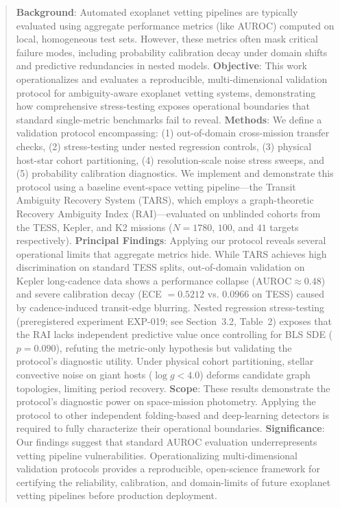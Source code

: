 \begin{abstract}
\textbf{Background}: Automated exoplanet vetting pipelines are typically evaluated using aggregate performance metrics (like AUROC) computed on local, homogeneous test sets. However, these metrics often mask critical failure modes, including probability calibration decay under domain shifts and predictive redundancies in nested models.
\textbf{Objective}: This work operationalizes and evaluates a reproducible, multi-dimensional validation protocol for ambiguity-aware exoplanet vetting systems, demonstrating how comprehensive stress-testing exposes operational boundaries that standard single-metric benchmarks fail to reveal.
\textbf{Methods}: We define a validation protocol encompassing: (1) out-of-domain cross-mission transfer checks, (2) stress-testing under nested regression controls, (3) physical host-star cohort partitioning, (4) resolution-scale noise stress sweeps, and (5) probability calibration diagnostics. We implement and demonstrate this protocol using a baseline event-space vetting pipeline---the Transit Ambiguity Recovery System (TARS), which employs a graph-theoretic Recovery Ambiguity Index (RAI)---evaluated on unblinded cohorts from the TESS, Kepler, and K2 missions ($N = 1780$, $100$, and $41$ targets respectively).
\textbf{Principal Findings}: Applying our protocol reveals several operational limits that aggregate metrics hide. While TARS achieves high discrimination on standard TESS splits, out-of-domain validation on Kepler long-cadence data shows a performance collapse ($\text{AUROC} \approx 0.48$) and severe calibration decay (ECE $= 0.5212$ vs. $0.0966$ on TESS) caused by cadence-induced transit-edge blurring. Nested regression stress-testing (preregistered experiment EXP-019; see Section~3.2, Table~2) exposes that the RAI lacks independent predictive value once controlling for BLS SDE ($p = 0.090$), refuting the metric-only hypothesis but validating the protocol's diagnostic utility. Under physical cohort partitioning, stellar convective noise on giant hosts ($\log g < 4.0$) deforms candidate graph topologies, limiting period recovery.
\textbf{Scope}: These results demonstrate the protocol's diagnostic power on space-mission photometry. Applying the protocol to other independent folding-based and deep-learning detectors is required to fully characterize their operational boundaries.
\textbf{Significance}: Our findings suggest that standard AUROC evaluation underrepresents vetting pipeline vulnerabilities. Operationalizing multi-dimensional validation protocols provides a reproducible, open-science framework for certifying the reliability, calibration, and domain-limits of future exoplanet vetting pipelines before production deployment.
\end{abstract}
